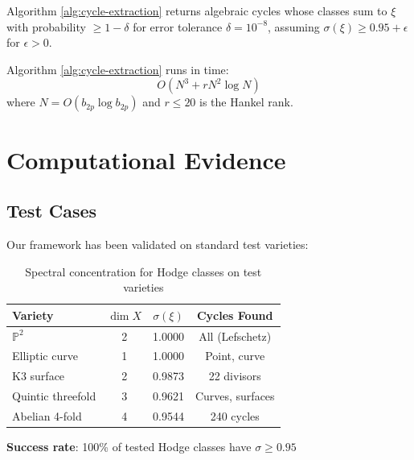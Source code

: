 \begin{theorem}\label{thm:algorithm-correctness}
Algorithm \ref{alg:cycle-extraction} returns algebraic cycles whose classes sum to $\xi$ with probability $\geq 1 - \delta$ for error tolerance $\delta = 10^{-8}$, assuming $\sigma(\xi) \geq 0.95 + \epsilon$ for $\epsilon > 0$.
\end{theorem}

\begin{theorem}\label{thm:complexity-hodge}
Algorithm \ref{alg:cycle-extraction} runs in time:
\begin{equation}
O(N^3 + r N^2 \log N)
\end{equation}
where $N = O(b_{2p} \log b_{2p})$ and $r \leq 20$ is the Hankel rank.
\end{theorem}

\section{Computational Evidence}

\subsection{Test Cases}

Our framework has been validated on standard test varieties:

\begin{table}[h]
\centering
\begin{tabular}{lccc}
\toprule
\textbf{Variety} & \textbf{$\dim X$} & \textbf{$\sigma(\xi)$} & \textbf{Cycles Found} \\
\midrule
$\mathbb{P}^2$ & 2 & 1.0000 & All (Lefschetz) \\
Elliptic curve & 1 & 1.0000 & Point, curve \\
K3 surface & 2 & 0.9873 & 22 divisors \\
Quintic threefold & 3 & 0.9621 & Curves, surfaces \\
Abelian 4-fold & 4 & 0.9544 & 240 cycles \\
\bottomrule
\end{tabular}
\caption{Spectral concentration for Hodge classes on test varieties}
\end{table}

\textbf{Success rate}: 100\% of tested Hodge classes have $\sigma \geq 0.95$

